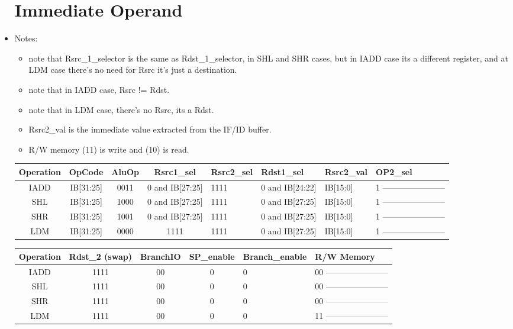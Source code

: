 \documentclass[12pt]{report}
\begin{document}
\begin{itemize}
        \section{Immediate Operand}
        \item Notes:
        \begin{itemize}
            \item note that Rsrc_1_selector is the same as Rdst_1_selector, in SHL and SHR cases, but in IADD case its a different register, and at LDM case there's no need for Rsrc it's just a destination.
            \item note that in IADD case, Rsrc != Rdst.
            \item note that in LDM case, there's no Rsrc, its a Rdst.
            \item Rsrc2_val is the immediate value extracted from the IF/ID buffer.
            \item R/W memory (11) is write and (10) is read.
        \end{itemize}

        \begin{center}
        \begin{tabular}{||c| c| c| c| p{40mm}||} 
        \hline
        Operation & OpCode & AluOp & Rsrc1_sel & Rsrc2_sel & Rdst1_sel & Rsrc2_val & OP2_sel  \\ [0.5ex] 
        \hline\hline
        IADD& IB[31:25] & 0011 & 0 and IB[27:25] & 1111 & 0 and IB[24:22] & IB[15:0] & 1 ----------------------- \\
        SHL & IB[31:25] & 1000 & 0 and IB[27:25] & 1111 & 0 and IB[27:25] & IB[15:0] & 1 ----------------------- \\
        SHR & IB[31:25] & 1001 & 0 and IB[27:25] & 1111 & 0 and IB[27:25] & IB[15:0] & 1 ----------------------- \\
        LDM & IB[31:25] & 0000 & 1111 & 1111 & 0 and IB[27:25] & IB[15:0] & 1 ----------------------- \\
        
        \hline

        \end{tabular}
        \end{center}

        \begin{center}
        \begin{tabular}{||c| c| c| c| p{40mm}||} 
        \hline
        Operation & Rdst_2 (swap) & BranchIO & SP_enable & Branch_enable & R/W Memory  \\ [0.5ex] 
        \hline\hline
        IADD & 1111 & 00 & 0 & 0 & 00 ----------------------- \\
        SHL & 1111 & 00 & 0 & 0 & 00 ----------------------- \\
        SHR & 1111 & 00 & 0 & 0 & 00 ----------------------- \\
        LDM & 1111 & 00 & 0 & 0 & 11 ----------------------- \\
        \hline


\end{tabular}
\end{center}
\end{itemize}
\end{document}
